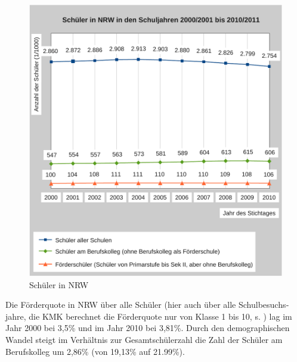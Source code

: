 \begin{figure}[htbp]
\centering
\includegraphics[width=\ScaleIfNeeded]{nrw01.pdf}%
\caption{Schüler in NRW}%
\label{NRW01}
\end{figure}
Die Förder­quote in NRW über alle Schüler (hier auch über alle Schul­be­suchs­jahre, die KMK berechnet die Förderquote nur von Klasse 1 bis 10, s. \citep{KMK:10b}) lag im Jahr 2000 bei 3,5\% und im Jahr 2010 bei 3,81\%.
Durch den de­mo­graphischen Wandel steigt im Verhältnis zur Gesamt­schüler­zahl die Zahl der Schüler am Berufs­kolleg um 2,86\% (von 19,13\% auf 21.99\%).

